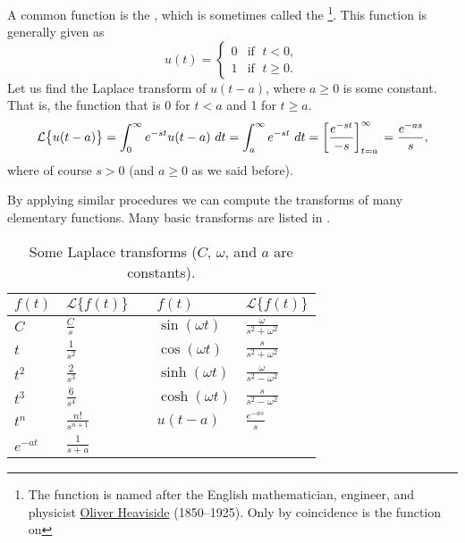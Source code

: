 \begin{example}
A common function is the \emph{}, which is
sometimes called the \emph{}%
\footnote{The function is named after the English mathematician, engineer, and
physicist
\href{https://en.wikipedia.org/wiki/Heaviside}{Oliver Heaviside}
(1850--1925).  Only
by coincidence is the function  on }.
This function is generally given as
\begin{equation*}
u(t) = 
\begin{cases}
0 & \text{if } \; t < 0 , \\
1 & \text{if } \; t \geq 0 .
\end{cases}
\end{equation*}
Let us find the Laplace transform of $u(t-a)$, where $a \geq 0$
is some constant.
That is, the function that is 0 for $t < a$ and 1 for $t \geq a$.
\begin{equation*}
\mathcal{L} \bigl\{ u(t-a) \bigr\}
=
\int_0^{\infty} e^{-st} u(t-a) ~ dt
=
\int_a^{\infty} e^{-st} ~ dt
=
\left[ \frac{e^{-st}}{-s} \right]_{t=a}^\infty \\
=
\frac{e^{-as}}{s} ,
\end{equation*}
where of course $s > 0$ (and $a \geq 0$ as we said before).
\end{example}

By applying similar procedures we can compute the transforms of many
elementary functions.  Many basic transforms are listed in
.

\begin{table}[h!t]
\mybeginframe
\capstart
\begin{center}
\begin{tabular}{@{}lllll@{}}
\toprule
$f(t)$ & $\mathcal{L} \bigl\{ f(t) \bigr\}$ & \hspace*{1.5cm} &
$f(t)$ & $\mathcal{L} \bigl\{ f(t) \bigr\}$ \\
\midrule
$C$ & $\frac{C}{s}$
& &
$\sin (\omega t)$ & $\frac{\omega}{s^2+\omega^2}$
\\[3pt]
$t$ & $\frac{1}{s^2}$
& &
$\cos (\omega t)$ & $\frac{s}{s^2+\omega^2}$
\\[3pt]
$t^2$ & $\frac{2}{s^3}$
& &
$\sinh (\omega t)$ & $\frac{\omega}{s^2-\omega^2}$
\\[3pt]
$t^3$ & $\frac{6}{s^4}$
& &
$\cosh (\omega t)$ & $\frac{s}{s^2-\omega^2}$
\\[3pt]
$t^n$ & $\frac{n!}{s^{n+1}}$
& &
$u(t-a)$ & $\frac{e^{-as}}{s}$
\\[3pt]
$e^{-at}$ & $\frac{1}{s+a}$
& & &
\\
\bottomrule
\end{tabular}
\end{center}
\caption{Some Laplace transforms ($C$, $\omega$, and $a$ are
constants).\label{lt:table}}
\myendframe
\end{table}

